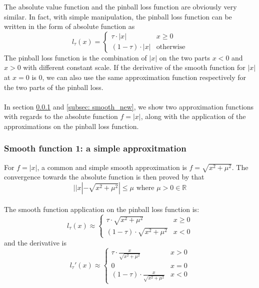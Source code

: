 The absolute value function and the pinball loss function are obviously very similar. In fact, with simple manipulation, the pinball loss function can be written in the form of absolute function as 
\begin{equation}
    l_\tau(x) = 
    \begin{cases}
        \tau \cdot |x| & {x \geq 0} \\
        (1-\tau) \cdot |x| & \text{otherwise}
    \end{cases}
\end{equation}
The pinball loss function is the combination of $|x|$ on the two parts $x<0$ and $x>0$ with different constant scale. 
If the derivative of the smooth function for $|x|$ at $x=0$ is $0$, we can also use the same approximation function respectively for the two parts of the pinball loss.
\\\\
In section \ref{subsec: smooth_sqrt} and \ref{subsec: smooth_new}, we show two approximation functions with regards to the absolute function $f = |x|$, along with the application of the approximations on the pinball loss function.

\subsubsection{Smooth function 1: a simple approxitmation}
\label{subsec: smooth_sqrt}

For $f = |x|$, a common and simple smooth approximation is $
    f = \sqrt{x^2 + \mu^2}
$.
 The convergence towards the absolute function is then proved by \citeauthor{voroninConvolutionBasedSmooth2015a}\cite{voroninConvolutionBasedSmooth2015a} that 
\begin{equation}
    ||x| - \sqrt{x^2 + \mu^2}| \leq \mu \text{  where } \mu > 0 \in \mathbb{R}
\end{equation}
\\
The smooth function application on the pinball loss function is:
\begin{equation}
    l_\tau(x) \approx 
    \begin{cases}
        \tau \cdot \sqrt{x^2 + \mu^2} & {x \geq 0} \\
        (1-\tau) \cdot \sqrt{x^2 + \mu^2} & {x < 0}
    \end{cases}
\end{equation}
and the derivative is
\begin{equation}
    l_\tau\prime(x) \approx 
    \begin{cases}
        \tau \cdot \frac{x}{\sqrt{x^2 + \mu^2}} & {x > 0} \\
        0 & {x=0} \\
        (1-\tau) \cdot \frac{x}{\sqrt{x^2 + \mu^2}} & {x<0}
    \end{cases}
\end{equation}
